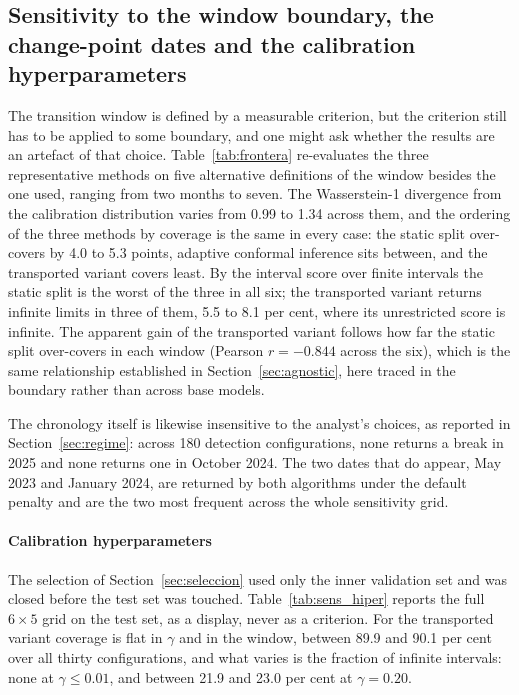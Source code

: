 \documentclass[preprint,3p,times]{elsarticle}
\begin{document}
\subsection{Sensitivity to the window boundary, the change-point dates and the calibration hyperparameters}
\label{sec:frontera}

The transition window is defined by a measurable criterion, but the criterion still has to be applied to some boundary, and one might ask whether the results are an artefact of that choice. Table~\ref{tab:frontera} re-evaluates the three representative methods on five alternative definitions of the window besides the one used, ranging from two months to seven. The Wasserstein-1 divergence from the calibration distribution varies from 0.99 to 1.34 across them, and the ordering of the three methods by coverage is the same in every case: the static split over-covers by 4.0 to 5.3 points, adaptive conformal inference sits between, and the transported variant covers least. By the interval score over finite intervals the static split is the worst of the three in all six; the transported variant returns infinite limits in three of them, 5.5 to 8.1 per cent, where its unrestricted score is infinite. The apparent gain of the transported variant follows how far the static split over-covers in each window (Pearson $r=-0.844$ across the six), which is the same relationship established in Section~\ref{sec:agnostic}, here traced in the boundary rather than across base models.



The chronology itself is likewise insensitive to the analyst's choices, as reported in Section~\ref{sec:regime}: across 180 detection configurations, none returns a break in 2025 and none returns one in October 2024. The two dates that do appear, May 2023 and January 2024, are returned by both algorithms under the default penalty and are the two most frequent across the whole sensitivity grid.

\paragraph{Calibration hyperparameters} The selection of Section~\ref{sec:seleccion} used only the inner validation set and was closed before the test set was touched. Table~\ref{tab:sens_hiper} reports the full $6\times5$ grid on the test set, as a display, never as a criterion. For the transported variant coverage is flat in $\gamma$ and in the window, between 89.9 and 90.1 per cent over all thirty configurations, and what varies is the fraction of infinite intervals: none at $\gamma\le 0.01$, and between 21.9 and 23.0 per cent at $\gamma=0.20$.
\end{document}
